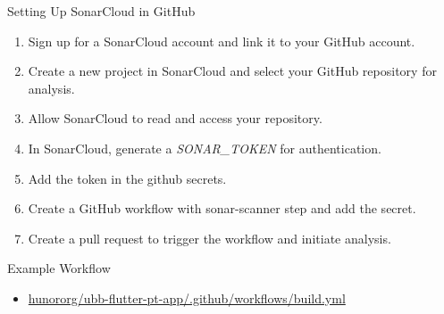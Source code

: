 \documentclass{beamer}
\begin{document}
\begin{frame}{Setting Up SonarCloud in GitHub}
  
  \begin{enumerate}
    \item Sign up for a SonarCloud account and link it to your GitHub account.
    \item Create a new project in SonarCloud and select your GitHub repository for analysis.
    \item Allow SonarCloud to read and access your repository.
    \item In SonarCloud, generate a \small{\textit{SONAR\_TOKEN}} \normalsize for authentication.
    \item Add the token in the github secrets.
    \item Create a GitHub workflow with sonar-scanner step and add the secret.
    \item Create a pull request to trigger the workflow and initiate analysis.
  \end{enumerate}

\end{frame}

\begin{frame}{Example Workflow}
  \begin{itemize}
    \item \href{https://github.com/hunororg/ubb-flutter-pt-app/blob/main/.github/workflows/build.yml}{hunororg/ubb-flutter-pt-app/.github/workflows/build.yml}
  \end{itemize}
\end{frame}


 
\end{document}
